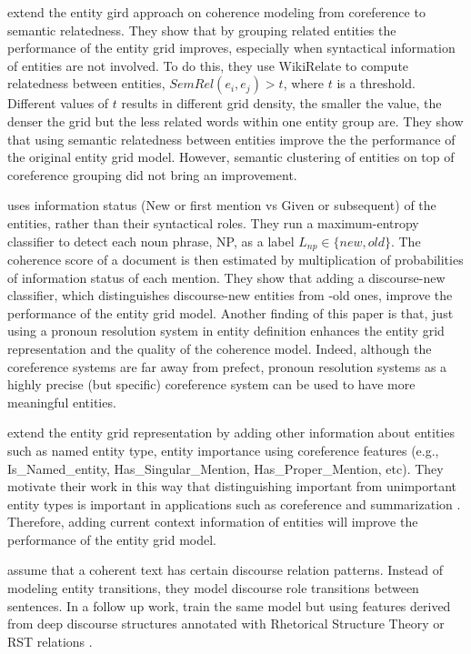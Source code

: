 extend the entity gird approach on coherence modeling from coreference to semantic relatedness. 
They show that by grouping related entities the performance of the entity grid improves, especially when syntactical information of entities are not involved. 
To do this, they use WikiRelate \cite{strube.aaai06} to compute relatedness between entities, $SemRel(e_i,e_j) >t$, where $t$ is a threshold.
Different values of $t$ results in different grid density, the smaller the value, the denser the grid but the less related words within one entity group are. 
They show that using semantic relatedness between entities improve the the performance of the original entity grid model.  
However, semantic clustering of entities on top of coreference grouping did not bring an improvement. 

 uses information status (New or first mention vs Given or subsequent) of the entities, rather than their syntactical roles. 
They run a maximum-entropy classifier to detect each noun phrase, NP, as a label $L_{np} \in \lbrace new, old \rbrace$. 
The coherence score of a document is then estimated by multiplication of probabilities of information status of each mention. 
They show that adding a discourse-new classifier, which distinguishes discourse-new entities from -old ones, improve the performance of the entity grid model. 
Another finding of this paper is that, just using a pronoun resolution system in entity definition enhances the entity grid representation and the quality of the coherence model. 
Indeed, although the coreference systems are far away from prefect, pronoun resolution systems as a highly precise (but specific) coreference system can be used to have more meaningful entities. 

 extend the entity grid representation by adding other information about entities such as named entity type, entity importance using coreference features (e.g., Is\_Named\_entity, Has\_Singular\_Mention, Has\_Proper\_Mention, etc). 
They motivate their work in this way that distinguishing important from unimportant entity types is important in applications such as coreference \cite{haghighi10} and summarization \cite{nenkova05}. 
Therefore, adding current context information of entities will improve the performance of the entity grid model. 


 assume that a coherent text has certain discourse relation patterns. 
Instead of modeling entity transitions, they model discourse role transitions between sentences.
In a follow up work,  train the same model but using features derived from deep discourse structures annotated with Rhetorical Structure Theory or RST relations \cite{mann88}. 

